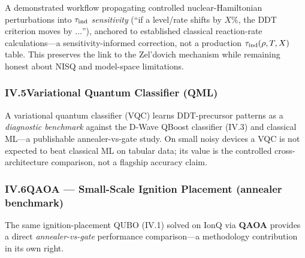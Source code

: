 \documentclass[11pt]{article}
\begin{document}
\begin{qbox}[Deliverable]
A demonstrated workflow propagating controlled nuclear-Hamiltonian perturbations into $\tau_{\rm
ind}$ \emph{sensitivity} (``if a level/rate shifts by $X\%$, the DDT criterion moves by $\dots$''),
anchored to established classical reaction-rate calculations---a sensitivity-informed correction, not
a production $\tau_{\rm ind}(\rho,T,X)$ table. This preserves the link to the Zel'dovich mechanism
while remaining honest about NISQ and model-space limitations.
\end{qbox}

\subsubsection*{IV.5\quad Variational Quantum Classifier (QML)}
A variational quantum classifier (VQC) learns DDT-precursor patterns as a \emph{diagnostic benchmark}
against the D-Wave QBoost classifier (IV.3) and classical ML---a publishable annealer-vs-gate study.
On small noisy devices a VQC is not expected to beat classical ML on tabular data; its value is the
controlled cross-architecture comparison, not a flagship accuracy claim.

\subsubsection*{IV.6\quad QAOA --- Small-Scale Ignition Placement (annealer benchmark)}
The same ignition-placement QUBO (IV.1) solved on IonQ via \textbf{QAOA} provides a direct
\emph{annealer-vs-gate} performance comparison---a methodology contribution in its own right.
\end{document}
